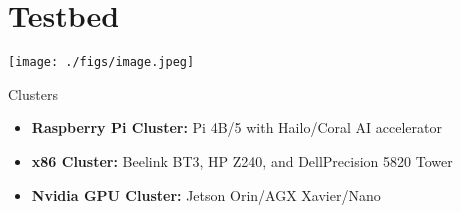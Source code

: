 \documentclass[landscape,a0,final]{a0poster} %
\begin{document}
\begin{minipage}{0.98\linewidth}
\begin{minipage}[t]{0.3\linewidth}
\section{Testbed}
\vspace{-20pt}
\begin{center}
\texttt{[image: ./figs/image.jpeg]}
\end{center}
\begin{myframe}{Clusters}
    \begin{itemize}
        \item \textbf{Raspberry Pi Cluster:} Pi 4B/5 with Hailo/Coral AI accelerator
        \item \textbf{x86 Cluster:} Beelink BT3, HP Z240, and DellPrecision 5820 Tower 
        \item \textbf{Nvidia GPU Cluster:} Jetson Orin/AGX Xavier/Nano
    \end{itemize}
\end{myframe}

% 
% 


\end{minipage}
\end{minipage}
\end{document}
